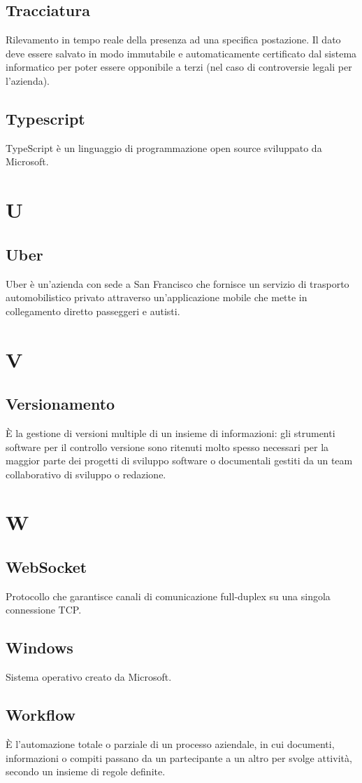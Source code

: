 \subsection{Tracciatura} Rilevamento in tempo reale della presenza ad una specifica
postazione. Il dato deve essere salvato in modo immutabile e automaticamente certificato dal
sistema informatico per poter essere opponibile a terzi (nel caso di controversie legali per l’azienda).
\subsection{Typescript} TypeScript è un linguaggio di programmazione open source sviluppato da Microsoft.
\newpage \section{U}
\subsection{Uber} Uber è un'azienda con sede a San Francisco che fornisce un servizio di trasporto automobilistico privato attraverso un'applicazione mobile che mette in collegamento diretto passeggeri e autisti.
\newpage \section{V}
\subsection{Versionamento} È la gestione di versioni multiple di un insieme di informazioni: gli strumenti software per il controllo versione sono ritenuti molto spesso necessari per la maggior parte dei progetti di sviluppo software o documentali gestiti da un team collaborativo di sviluppo o redazione.
\newpage \section{W}
\subsection{WebSocket} Protocollo che garantisce canali di comunicazione full-duplex su una singola connessione TCP.
\subsection{Windows} Sistema operativo creato da Microsoft.
\subsection{Workflow} È l’automazione totale o parziale di un processo aziendale, in cui documenti, informazioni o compiti passano da un partecipante a un altro per svolge attività, secondo un insieme di regole definite.

